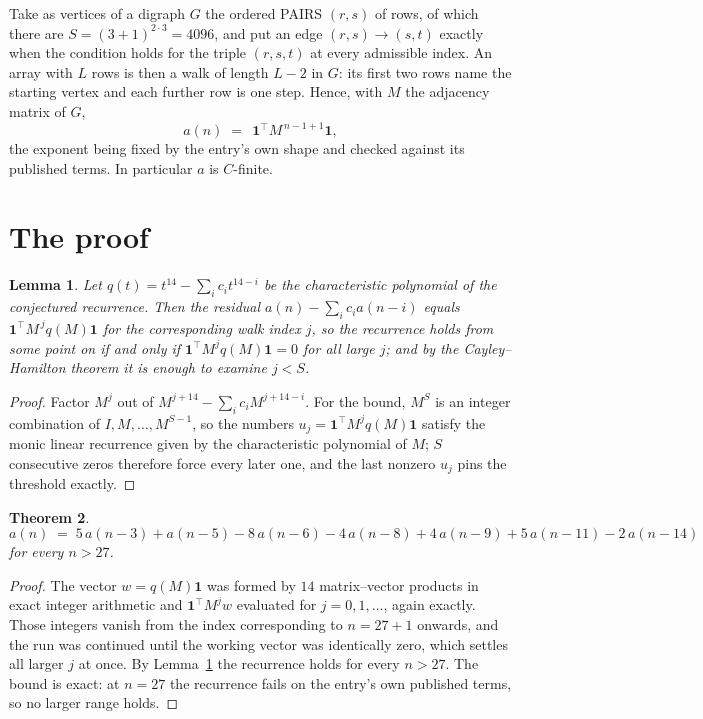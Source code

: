 \documentclass[11pt,a4paper]{article}
\theoremstyle{plain}
\newtheorem{theorem}{Theorem}
\newtheorem{lemma}[theorem]{Lemma}
\theoremstyle{definition}
\begin{document}
Take as vertices of a digraph $G$ the ordered PAIRS $(r,s)$ of rows, of which there are
$S=(3+1)^{2\cdot3}=4096$, and put an edge $(r,s)\to(s,t)$ exactly when the condition
holds for the triple $(r,s,t)$ at every admissible index. An array with $L$ rows is then a
walk of length $L-2$ in $G$: its first two rows name the starting vertex and each further
row is one step. Hence, with $M$ the adjacency matrix of $G$,
\[
a(n)\;=\;\,\mathbf{1}^{\!\top}M^{\,n-1+1}\mathbf{1},
\]
the exponent being fixed by the entry's own shape and checked against its published terms.
In particular $a$ is $C$-finite.

\section{The proof}

\begin{lemma}\label{lem:crit}
Let $q(t)=t^{14}-\sum_i c_it^{14-i}$ be the characteristic polynomial of the
conjectured recurrence. Then the residual $a(n)-\sum_ic_ia(n-i)$ equals
$\mathbf{1}^{\!\top}M^{\,j}q(M)\mathbf{1}$ for the corresponding walk index
$j$, so the recurrence holds from some point on if and only if
$\mathbf{1}^{\!\top}M^{j}q(M)\mathbf{1}=0$ for all large $j$; and by the
Cayley--Hamilton theorem it is enough to examine $j<S$.
\end{lemma}

\begin{proof}
Factor $M^{j}$ out of $M^{j+14}-\sum_ic_iM^{j+14-i}$. For the bound, $M^{S}$
is an integer combination of $I,M,\dots,M^{S-1}$, so the numbers
$u_j=\mathbf{1}^{\!\top}M^{j}q(M)\mathbf{1}$ satisfy the monic linear recurrence given by
the characteristic polynomial of $M$; $S$ consecutive zeros therefore force every later one,
and the last nonzero $u_j$ pins the threshold exactly.
\end{proof}

\begin{theorem}
\[
a(n)\;=\;5\,a(n-3) + a(n-5) - 8\,a(n-6) - 4\,a(n-8) + 4\,a(n-9) + 5\,a(n-11) - 2\,a(n-14)
\]
for every $n>27$.
\end{theorem}

\begin{proof}
The vector $w=q(M)\mathbf{1}$ was formed by $14$ matrix--vector products in exact
integer arithmetic and $\mathbf{1}^{\!\top}M^{j}w$ evaluated for $j=0,1,\dots$, again
exactly. Those integers vanish from the index corresponding to $n=27+1$ onwards, and the
run was continued until the working vector was identically zero, which settles all larger $j$
at once. By Lemma~\ref{lem:crit} the recurrence holds for every $n>27$. The bound is exact: at $n=27$ the recurrence fails on the entry's own published terms, so no larger range holds.
\end{proof}
\end{document}

